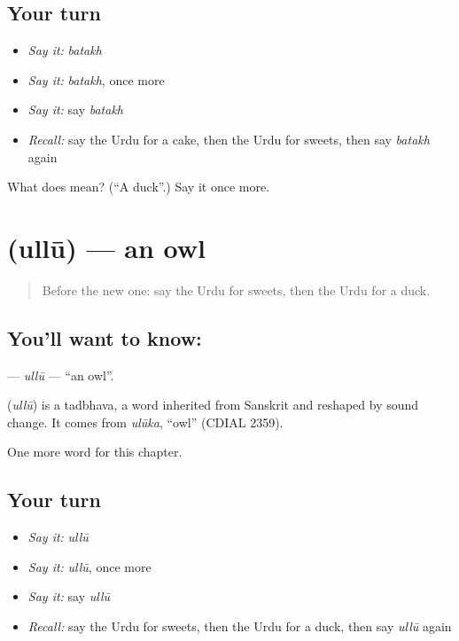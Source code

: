 \subsection*{Your turn}
\begin{itemize}
\raggedright
  \item \emph{Say it:} \emph{batakh}
  \item \emph{Say it:} \emph{batakh}, once more
  \item \emph{Say it:} say \emph{batakh}
  \item \emph{Recall:} say the Urdu for a cake, then the Urdu for sweets, then say \emph{batakh} again
\end{itemize}

\begin{tcolorbox}[breakable,colback=teal!4,colframe=teal!35!black,title={Before you move on}]
What does  mean? (\textquotedblleft{}A duck\textquotedblright{}.) Say it once more.
\end{tcolorbox}
\section[\texorpdfstring{\ur{الو} (ullū)}{الو (ullū)}]{ (ullū) — an owl}

\label{lesson:UR-C168-ullu}



\begin{quote}
Before the new one: say the Urdu for sweets, then the Urdu for a duck.
\end{quote}

\subsection*{You'll want to know: }
\textbf{} — \emph{ullū} — \textquotedblleft{}an owl\textquotedblright{}.

\begin{cousinweb}
\textbf{} (\emph{ullū}) is a tadbhava, a word inherited from Sanskrit and reshaped by sound change. It comes from \emph{ulūka}, \textquotedblleft{}owl\textquotedblright{} (CDIAL 2359).
\end{cousinweb}

\begin{grammarlens}[title={What you've built}]
One more word for this chapter.
\end{grammarlens}

\subsection*{Your turn}
\begin{itemize}
\raggedright
  \item \emph{Say it:} \emph{ullū}
  \item \emph{Say it:} \emph{ullū}, once more
  \item \emph{Say it:} say \emph{ullū}
  \item \emph{Recall:} say the Urdu for sweets, then the Urdu for a duck, then say \emph{ullū} again
\end{itemize}

